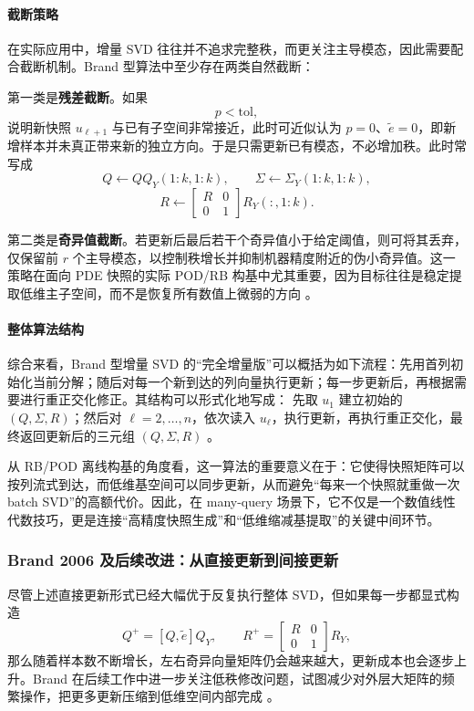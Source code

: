 \paragraph{截断策略}

在实际应用中，增量 SVD 往往并不追求完整秩，而更关注主导模态，因此需要配合截断机制。Brand 型算法中至少存在两类自然截断：

第一类是\textbf{残差截断}。如果
\[
p<\mathrm{tol},
\]
说明新快照 $u_{\ell+1}$ 与已有子空间非常接近，此时可近似认为 $p=0$、$\tilde e=0$，即新增样本并未真正带来新的独立方向。于是只需更新已有模态，不必增加秩。此时常写成
\[
Q \leftarrow QQ_Y(1\!:\!k,1\!:\!k),\qquad
\Sigma \leftarrow \Sigma_Y(1\!:\!k,1\!:\!k),
\]
\[
R \leftarrow
\begin{bmatrix}
R & 0\\
0 & 1
\end{bmatrix}
R_Y(:,1\!:\!k).
\]

第二类是\textbf{奇异值截断}。若更新后最后若干个奇异值小于给定阈值，则可将其丢弃，仅保留前 $r$ 个主导模态，以控制秩增长并抑制机器精度附近的伪小奇异值。这一策略在面向 PDE 快照的实际 POD/RB 构基中尤其重要，因为目标往往是稳定提取低维主子空间，而不是恢复所有数值上微弱的方向 \cite{fareed2018,fareed2020,zhang2022}。

\paragraph{整体算法结构}

综合来看，Brand 型增量 SVD 的“完全增量版”可以概括为如下流程：先用首列初始化当前分解；随后对每一个新到达的列向量执行更新；每一步更新后，再根据需要进行重正交化修正。其结构可以形式化地写成：
先取 $u_1$ 建立初始的 $(Q,\Sigma,R)$；然后对 $\ell=2,\dots,n$，依次读入 $u_\ell$，执行更新，再执行重正交化，最终返回更新后的三元组 $(Q,\Sigma,R)$ \cite{brand2002,brand2006,zhang2022}。

从 RB/POD 离线构基的角度看，这一算法的重要意义在于：它使得快照矩阵可以按列流式到达，而低维基空间可以同步更新，从而避免“每来一个快照就重做一次 batch SVD”的高额代价。因此，在 many-query 场景下，它不仅是一个数值线性代数技巧，更是连接“高精度快照生成”和“低维缩减基提取”的关键中间环节。

\subsubsection{Brand 2006 及后续改进：从直接更新到间接更新}

尽管上述直接更新形式已经大幅优于反复执行整体 SVD，但如果每一步都显式构造
\[
Q^+=[Q,\tilde e]Q_Y,\qquad
R^+=
\begin{bmatrix}
R & 0\\
0 & 1
\end{bmatrix}R_Y,
\]
那么随着样本数不断增长，左右奇异向量矩阵仍会越来越大，更新成本也会逐步上升。Brand 在后续工作中进一步关注低秩修改问题，试图减少对外层大矩阵的频繁操作，把更多更新压缩到低维空间内部完成 \cite{brand2006}。

